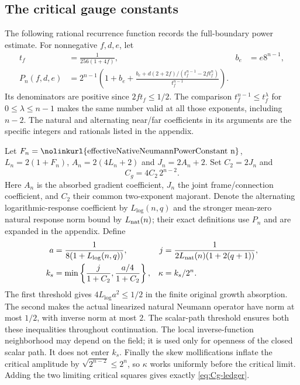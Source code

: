\documentclass[11pt,a4paper]{article}
\numberwithin{equation}{section}
\theoremstyle{definition}
\theoremstyle{remark}
\newcommand{\lean}[1]{\nolinkurl{#1}}
\begin{document}
\subsection{The critical gauge constants}
The following rational recurrence function records the full-boundary
power estimate. For nonnegative $f,d,e$, let
\begin{align*}
 t_f&=\frac1{256(1+4f)},& b_e&=e8^{n-1},\\
 P_n(f,d,e)&=2^{n-1}\left(1+b_e+
 \frac{b_e+d(2+2f)/(t_f^{n-1}-2ft_f^n)}{t_f^{n-1}}\right).
\end{align*}
Its denominators are positive since $2ft_f\leq1/2$.
The comparison $t_f^{n-1}\leq t_f^\lambda$ for
$0\leq\lambda\leq n-1$ makes the same number valid at all those
exponents, including $n-2$. The natural and alternating near/far
coefficients in its arguments are the specific integers and rationals
listed in the appendix.

Let $F_n=\text{\lean{effectiveNativeNeumannPowerConstant n}}$,
$L_n=2(1+F_n)$, $A_n=2(4L_n+2)$ and $J_n=2A_n+2$.
Set $C_2=2J_n$ and
\begin{equation}\label{eq:Cg-ledger}
 C_g=4C_2\,2^{n-2}.
\end{equation}
Here $A_n$ is the absorbed gradient coefficient, $J_n$ the joint
frame/connection coefficient, and $C_2$ their common two-exponent
majorant. Denote the alternating logarithmic-response coefficient by
$L_{\log}(n,q)$ and the stronger mean-zero natural response norm bound
by $L_{\rm nat}(n)$; their exact definitions use $P_n$ and are expanded
in the appendix. Define
\begin{align}
 a&=\frac1{8(1+L_{\log}(n,q))},&
 j&=\frac1{2L_{\rm nat}(n)(1+2(q+1))},\nonumber\\
 k_s&=\min\left\{\frac j{1+C_2},
                         \frac{a/4}{1+C_2}\right\},&
 \kappa&=k_s/2^n.\label{eq:kappa-ledger}
\end{align}
The first threshold gives $4L_{\log}a^2\leq1/2$ in the finite original
growth absorption. The second makes the actual linearized natural
Neumann operator have norm at most $1/2$, with inverse norm at most $2$.
The scalar-path threshold ensures both these inequalities throughout
continuation. The local inverse-function neighborhood may depend on
the field; it is used only for openness of the closed scalar path.
It does not enter $k_s$. Finally the skew mollifications inflate the
critical amplitude by $\sqrt{2^{n-2}}\leq2^n$, so $\kappa$ works
uniformly before the critical limit. Adding the two limiting critical
squares gives exactly \eqref{eq:Cg-ledger}.
\end{document}
